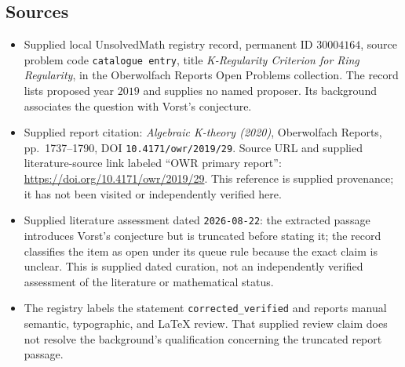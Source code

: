 \documentclass[11pt]{article}
\begin{document}
\subsection{Sources}
\begin{itemize}
\item Supplied local UnsolvedMath registry record, permanent ID $30004164$, source problem code \texttt{catalogue entry}, title \emph{K-Regularity Criterion for Ring Regularity}, in the Oberwolfach Reports Open Problems collection. The record lists proposed year $2019$ and supplies no named proposer. Its background associates the question with Vorst's conjecture.
\item Supplied report citation: \emph{Algebraic K-theory (2020)}, Oberwolfach Reports, pp.~1737--1790, DOI \texttt{10.4171/owr/2019/29}. Source URL and supplied literature-source link labeled ``OWR primary report'': \url{https://doi.org/10.4171/owr/2019/29}. This reference is supplied provenance; it has not been visited or independently verified here.
\item Supplied literature assessment dated \texttt{2026-08-22}: the extracted passage introduces Vorst's conjecture but is truncated before stating it; the record classifies the item as open under its queue rule because the exact claim is unclear. This is supplied dated curation, not an independently verified assessment of the literature or mathematical status.
\item The registry labels the statement \texttt{corrected\_verified} and reports manual semantic, typographic, and LaTeX review. That supplied review claim does not resolve the background's qualification concerning the truncated report passage.
\end{itemize}
\end{document}
